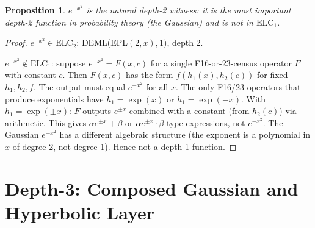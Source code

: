 \documentclass[11pt]{article}
\newtheorem{proposition}[theorem]{Proposition}
\begin{document}
\begin{proposition}
$e^{-x^2}$ is the \emph{natural} depth-2 witness: it is the most important
depth-2 function in probability theory (the Gaussian) and is not in $\mathrm{ELC}_1$.
\end{proposition}

\begin{proof}
$e^{-x^2} \in \mathrm{ELC}_2$: DEML(EPL$(2,x), 1)$, depth 2.

$e^{-x^2} \notin \mathrm{ELC}_1$: suppose $e^{-x^2} = F(x,c)$ for a single
F16-or-23-census operator $F$ with constant $c$. Then $F(x,c)$ has the form
$f(h_1(x), h_2(c))$ for fixed $h_1, h_2, f$. The output must equal $e^{-x^2}$
for all $x$. The only F16/23 operators that produce exponentials have $h_1 = \exp(x)$
or $h_1 = \exp(-x)$. With $h_1 = \exp(\pm x)$: $F$ outputs $e^{\pm x}$ combined
with a constant (from $h_2(c)$) via arithmetic. This gives $\alpha e^{\pm x} + \beta$
or $\alpha e^{\pm x} \cdot \beta$ type expressions, not $e^{-x^2}$.
The Gaussian $e^{-x^2}$ has a different algebraic structure (the exponent is a polynomial
in $x$ of degree 2, not degree 1). Hence not a depth-1 function.
\end{proof}

\section{Depth-3: Composed Gaussian and Hyperbolic Layer}
\label{sec:depth3}
\end{document}
